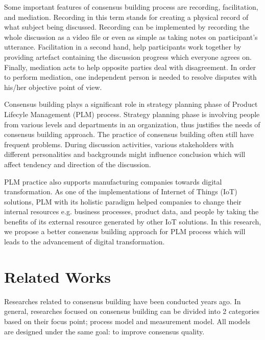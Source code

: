 \documentclass[10pt, conference, compsocconf]{IEEEtran}
\begin{document}
Some important features of consensus building process are recording, facilitation, and mediation\cite{b1}. Recording in this term stands for creating a physical record of what subject being discussed. Recording can be implemented by recording the whole discussion as a video file or even as simple as taking notes on participant's utterance. Facilitation in a second hand, help participants work together by providing artefact containing the discussion progress which everyone agrees on. Finally, mediation acts to help opposite parties deal with disagreement. In order to perform mediation, one independent person is needed to resolve disputes with his/her objective point of view.

Consensus building plays a significant role in strategy planning phase of Product Lifecyle Management (PLM) process\cite{b23}.  Strategy planning phase is involving people from various levels and departments in an organization\cite{b1}, thus justifies the needs of consensus building approach. The practice of consensus building often still have frequent problems. During discussion activities, various stakeholders with different personalities and backgrounds might influence conclusion\cite{b2} which will affect tendency and direction of the discussion\cite{b3}.

PLM practice also supports manufacturing companies towards digital transformation\cite{b24}. As one of the implementations of Internet of Things (IoT) solutions, PLM with its holistic paradigm helped companies to change their internal resources e.g. business processes, product data, and people by taking the benefits of its external resource generated by other IoT solutions. In this research, we propose a better consensus building approach for PLM process which will leads to the advancement of digital transformation.

\section{Related Works}
\label{sec_rp}
Researches related to consensus building have been conducted years ago. In general, researches focused on consensus building can be divided into 2 categories based on their focus point; process model and measurement model. All models are designed under the same goal: to improve consensus quality.
\end{document}
